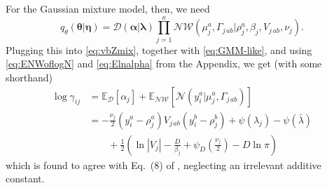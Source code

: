 \documentclass[aps,showpacs,twocolumn,prd,superscriptaddress,nofootinbib]{revtex4}
\newcommand{\be}{\begin{equation}}
\newcommand{\ee}{\end{equation}}
\newcommand{\nn}{\nonumber}
\newcommand{\E}[1]{{\mathbb E}_{#1}\!}
\begin{document}
For the Gaussian mixture model, then, we need
\be
q_\theta(\bm\theta|\bm\eta)=\mathcal{D}\left(\bm\alpha|\bm\lambda\right)\prod_{j=1}^\kappa\mathcal{NW}\left(\mu_j^a,\Gamma_{j\,ab}|\rho_j^a,\beta_j,V_{j\,ab},\nu_j\right).
\ee
Plugging this into \eqref{eq:vbZmix}, together with \eqref{eq:GMM-like}, and using \eqref{eq:ENWoflogN} and \eqref{eq:Elnalpha} from the Appendix, we get (with some shorthand)
\begin{align}
  \log \gamma_{ij}&=\E{\mathcal{D}}\left[\alpha_j\right]+\E{\mathcal{NW}}\left[\mathcal{N}(y_i^a|\mu_j^a,\Gamma_{j\,ab})\right]\nn\\
  &=
  -\frac{\nu_j}2(y_i^a-\rho_j^a)V_{j\,ab}(y_i^b-\rho_j^b)+\psi(\lambda_j)-\psi(\bar\lambda)\nn\\
  &\qquad
  +\frac12\left(\ln|V_j|-\frac D{\beta_j}+\psi_D\left(\frac{\nu_j}2\right)-D\ln\pi \right)\label{eq:GM-parition}
\end{align}
which is found to agree with Eq.~(8) of \cite{Attias2000}, neglecting an irrelevant additive constant.
\end{document}
